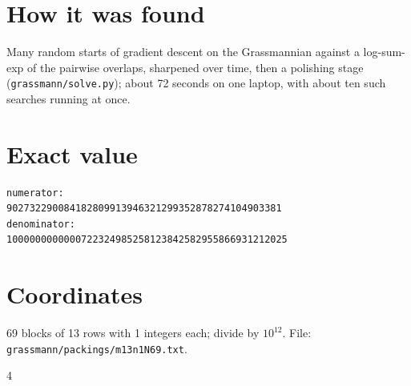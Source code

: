 \documentclass[11pt,a4paper]{article}
\begin{document}
\section{How it was found}
Many random starts of gradient descent on the Grassmannian against a log-sum-exp of the pairwise overlaps, sharpened over time, then a polishing stage (\texttt{grassmann/solve.py}); about 72 seconds on one laptop, with about ten such searches running at once.


\appendix
\section{Exact value}
{\small
\begin{verbatim}
numerator:
902732290084182809913946321299352878274104903381
denominator:
1000000000000722324985258123842582955866931212025
\end{verbatim}}

\section{Coordinates}
69 blocks of 13 rows with 1 integers each; divide by $10^{12}$. File: \texttt{grassmann/packings/m13n1N69.txt}.
{\tiny
\begin{multicols}{4}
\end{multicols}}
\end{document}
